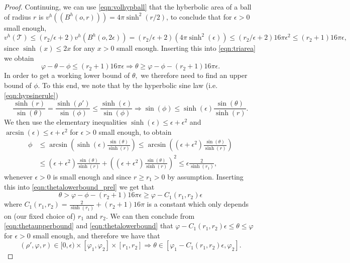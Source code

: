 \documentclass[10pt,a4paper]{amsart}
\newcommand{\CT}{{\mathcal{T}}}
\begin{document}
\begin{proof}
Continuing, we can use \eqref{eqn:volhypball} that the hyberbolic area 
of a ball of radius $r$ is
$v^h((B^h(o,r)))=4 \pi \sinh^2(r/2)$,
to conclude that for $\epsilon>0$ small enough,
\[
v^h(\CT) \leq (r_2/\epsilon+2)v^h(B^h(o,2\epsilon))
=(r_2/\epsilon+2)(4 \pi \sinh^2(\epsilon)) 
\leq (r_2/\epsilon+2)16\pi \epsilon^2
\leq (r_2+1)16\pi \epsilon,  
\]
since $\sinh(x)\leq 2x$ for any $x>0$ small enough.
Inserting this into \eqref{eqn:triarea} we obtain
\begin{equation} \label{eqn:thetalowerbound_prel}
\varphi-\theta-\phi \leq (r_2+1)16\pi  \epsilon
\Rightarrow \theta\geq \varphi-\phi-(r_2+1)16\pi  \epsilon.    
\end{equation}
In order to get a working lower bound of $\theta,$ we therefore need to find an upper 
bound of $\phi.$ To this end, we note that by the hyperbolic sine law (i.e. \eqref{eqn:hypsinerule})
\[
\frac{\sinh(r)}{\sin(\theta)}=\frac{\sinh(\rho')}{\sin (\phi)}
\leq \frac{\sinh(\epsilon)}{\sin (\phi)}
\Rightarrow \sin(\phi)\leq \sinh(\epsilon) \frac{\sin(\theta)}{\sinh(r)}.
\]
We then use the elementary inequalities $\sinh(\epsilon)\leq \epsilon+\epsilon^2$
and $\arcsin(\epsilon)\leq \epsilon+\epsilon^2$
for $\epsilon>0$ small enough, to obtain
\begin{align} \label{eqn:phiuppest}
 \phi & \leq \arcsin\left(\sinh(\epsilon)\frac{\sin(\theta)}{\sinh(r)}\right)   
\leq \arcsin\left((\epsilon+\epsilon^2)
\frac{\sin(\theta)}{\sinh(r)}\right)\\
& \leq (\epsilon+\epsilon^2)\frac{\sin(\theta)}{\sinh(r)}
+\left((\epsilon+\epsilon^2)\frac{\sin(\theta)}{\sinh(r)}\right)^2
\leq \epsilon\frac{2}{\sinh(r_1)}, \nonumber
\end{align}
whenever $\epsilon>0$ is small enough and since $r\geq r_1>0$ by assumption. 
Inserting this into \eqref{eqn:thetalowerbound_prel} we get that
\begin{equation} \label{eqn:thetalowerbound}
\theta>\varphi-\phi-(r_2+1)16\pi \epsilon \geq \varphi-C_1(r_1,r_2) \epsilon  
\end{equation}
where $C_1(r_1,r_2)=\frac{2}{\sinh(r_1)}+(r_2+1)16\pi$ is a constant which only depends on 
(our fixed choice of) $r_1$ and $r_2.$
We can then conclude from \eqref{eqn:thetaupperbound} and \eqref{eqn:thetalowerbound} that 
$\varphi-C_1(r_1,r_2) \epsilon \leq \theta \leq \varphi$ for $\epsilon>0$ small enough,
and therefore we have that
\begin{equation} \label{eqn:thetaimpliedbounds}
(\rho',\varphi,r)\in[0,\epsilon) \times [\varphi_1,\varphi_2]
\times [r_1,r_2]  
\Rightarrow \theta\in[\varphi_1-C_1(r_1,r_2)\epsilon,\varphi_2].  
\end{equation}


\end{proof}
\end{document}
